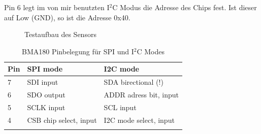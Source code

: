 \documentclass[12pt,a4paper,twoside,BCOR=12.5mm]{scrartcl}
\begin{document}
Pin 6 legt im von mir benutzten I$^2$C Modus die Adresse des Chips fest. Ist dieser auf Low (GND), so ist die Adresse 0x40.



\begin{figure}[htb]
	
	\caption{Testaufbau des Sensors}
	\label{testaufbaufigure}
\end{figure}


\begin{table}[htb]
\begin{tabular}{@{}lll@{}}      
    	\cmidrule(r){1-3}\morecmidrules\cmidrule(r){1-3}
       	Pin & SPI mode & I2C mode\\
      	\midrule
 	7 & SDI input & SDA birectional (!) \\ 
 	6 & SDO output & ADDR adress bit, input \\
 	5 & SCLK input & SCL input \\
 	4 & CSB chip select, input & I2C mode select, input \\
 	 \addlinespace
 	 \bottomrule
 \end{tabular}
\caption{BMA180 Pinbelegung für SPI und I$^2$C Modes \citep{Sensortec:2009rt}}
\label{i2cmode}
\end{table}
\end{document}
